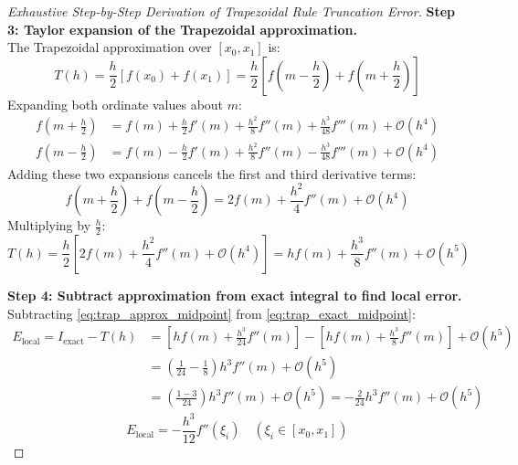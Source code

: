 \begin{proof}[Exhaustive Step-by-Step Derivation of Trapezoidal Rule Truncation Error]
\noindent\textbf{Step 3: Taylor expansion of the Trapezoidal approximation.} \\
The Trapezoidal approximation over $[x_0, x_1]$ is:
\begin{equation}
    T(h) = \frac{h}{2} \left[ f(x_0) + f(x_1) \right] = \frac{h}{2} \left[ f\left(m - \frac{h}{2}\right) + f\left(m + \frac{h}{2}\right) \right]
\end{equation}
Expanding both ordinate values about $m$:
\begin{align}
    f\left(m + \frac{h}{2}\right) &= f(m) + \frac{h}{2} f'(m) + \frac{h^2}{8} f''(m) + \frac{h^3}{48} f'''(m) + \mathcal{O}(h^4) \\
    f\left(m - \frac{h}{2}\right) &= f(m) - \frac{h}{2} f'(m) + \frac{h^2}{8} f''(m) - \frac{h^3}{48} f'''(m) + \mathcal{O}(h^4)
\end{align}
Adding these two expansions cancels the first and third derivative terms:
\begin{equation}
    f\left(m + \frac{h}{2}\right) + f\left(m - \frac{h}{2}\right) = 2 f(m) + \frac{h^2}{4} f''(m) + \mathcal{O}(h^4)
\end{equation}
Multiplying by $\frac{h}{2}$:
\begin{equation}
    \label{eq:trap_approx_midpoint}
    T(h) = \frac{h}{2} \left[ 2 f(m) + \frac{h^2}{4} f''(m) + \mathcal{O}(h^4) \right] = h f(m) + \frac{h^3}{8} f''(m) + \mathcal{O}(h^5)
\end{equation}

\noindent\textbf{Step 4: Subtract approximation from exact integral to find local error.} \\
Subtracting \eqref{eq:trap_approx_midpoint} from \eqref{eq:trap_exact_midpoint}:
\begin{align}
    E_{\text{local}} = I_{\text{exact}} - T(h) &= \left[ h f(m) + \frac{h^3}{24} f''(m) \right] - \left[ h f(m) + \frac{h^3}{8} f''(m) \right] + \mathcal{O}(h^5) \nonumber \\
    &= \left( \frac{1}{24} - \frac{1}{8} \right) h^3 f''(m) + \mathcal{O}(h^5) \nonumber \\
    &= \left( \frac{1 - 3}{24} \right) h^3 f''(m) + \mathcal{O}(h^5) = -\frac{2}{24} h^3 f''(m) + \mathcal{O}(h^5)
\end{align}
\begin{equation}
    \boxed{E_{\text{local}} = -\frac{h^3}{12} f''(\xi_i)} \quad (\xi_i \in [x_0, x_1])
\end{equation}


\end{proof}

